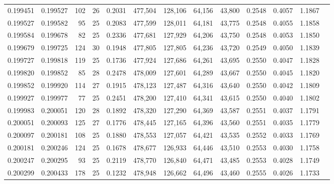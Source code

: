 \begin{tabular}{rrrrrrrrrrrrr}
0.199451 & 0.199527 & 102 &  26 &                                     0.2031 & 477,504 & 128,106 &  64,156 &  43,800 & 0.2548 & 0.4057 & 1.1867 \\
0.199527 & 0.199582 &  95 &  25 &                                     0.2083 & 477,599 & 128,011 &  64,181 &  43,775 & 0.2548 & 0.4055 & 1.1858 \\
0.199584 & 0.199678 &  82 &  25 &                                     0.2336 & 477,681 & 127,929 &  64,206 &  43,750 & 0.2548 & 0.4053 & 1.1850 \\
0.199679 & 0.199725 & 124 &  30 &                                     0.1948 & 477,805 & 127,805 &  64,236 &  43,720 & 0.2549 & 0.4050 & 1.1839 \\
0.199727 & 0.199818 & 119 &  25 &                                     0.1736 & 477,924 & 127,686 &  64,261 &  43,695 & 0.2550 & 0.4047 & 1.1828 \\
0.199820 & 0.199852 &  85 &  28 &                                     0.2478 & 478,009 & 127,601 &  64,289 &  43,667 & 0.2550 & 0.4045 & 1.1820 \\
0.199852 & 0.199920 & 114 &  27 &                                     0.1915 & 478,123 & 127,487 &  64,316 &  43,640 & 0.2550 & 0.4042 & 1.1809 \\
0.199927 & 0.199977 &  77 &  25 &                                     0.2451 & 478,200 & 127,410 &  64,341 &  43,615 & 0.2550 & 0.4040 & 1.1802 \\
0.199983 & 0.200051 & 120 &  28 &                                     0.1892 & 478,320 & 127,290 &  64,369 &  43,587 & 0.2551 & 0.4037 & 1.1791 \\
0.200051 & 0.200093 & 125 &  27 &                                     0.1776 & 478,445 & 127,165 &  64,396 &  43,560 & 0.2551 & 0.4035 & 1.1779 \\
0.200097 & 0.200181 & 108 &  25 &                                     0.1880 & 478,553 & 127,057 &  64,421 &  43,535 & 0.2552 & 0.4033 & 1.1769 \\
0.200181 & 0.200246 & 124 &  25 &                                     0.1678 & 478,677 & 126,933 &  64,446 &  43,510 & 0.2553 & 0.4030 & 1.1758 \\
0.200247 & 0.200295 &  93 &  25 &                                     0.2119 & 478,770 & 126,840 &  64,471 &  43,485 & 0.2553 & 0.4028 & 1.1749 \\
0.200299 & 0.200433 & 178 &  25 &                                     0.1232 & 478,948 & 126,662 &  64,496 &  43,460 & 0.2555 & 0.4026 & 1.1733 \\

\end{tabular}

